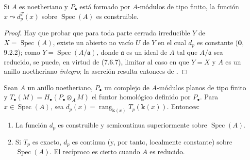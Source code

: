\begin{lemma}[7.6.8]
\label{III.7.6.8}
Si $A$ es noetheriano y $P_\bullet$ está formado por $A$-módulos de
tipo finito, la función $x\leadsto d_p^T(x)$ sobre $\operatorname{Spec}(A)$ es construible.
\end{lemma}

\begin{proof}
Hay que probar que para toda parte cerrada irreducible $Y$ de $X=\operatorname{Spec}(A)$, existe un abierto no vacío $U$ de $Y$ en el cual $d_p$ es constante ($\mathbf{0}$, 9.2.2); como
$Y=\operatorname{Spec}(A/\mathfrak a)$, donde $\mathfrak a$ es un ideal de $A$ tal
que $A/\mathfrak a$ sea reducido, se puede, en virtud de (7.6.7), limitar al caso en que $Y=X$ y $A$ es un anillo noetheriano
\emph{íntegro}; la aserción resulta entonces de .
\end{proof}

\begin{theorem}[7.6.9]
\label{III.7.6.9}
Sean $A$ un anillo noetheriano, $P_\bullet$ un complejo de
$A$-módulos planos de tipo finito y
$T_\bullet(M)=H_\bullet(P_\bullet\otimes_A M)$
el funtor homológico definido por $P_\bullet$. Para
$x\in\operatorname{Spec}(A)$, sea $d_p(x)=\operatorname{rang}_{\mathbf{k}(x)}T_p(\boldsymbol{k}(x))$.
Entonces:
\begin{enumerate}
  \item[\textup{(i)}] La función $d_p$ es construible y semicontinua
    superiormente sobre $\operatorname{Spec}(A)$.
  \item[\textup{(ii)}] Si $T_p$ es exacto, $d_p$ es continua (y, por tanto,
    localmente constante) sobre $\operatorname{Spec}(A)$. El recíproco es cierto
    cuando $A$
    es reducido.
\end{enumerate}
\end{theorem}

